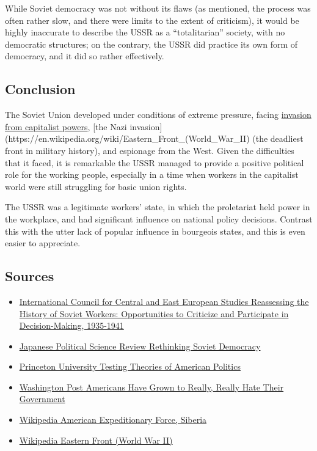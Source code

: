 While Soviet democracy was not without its flaws (as mentioned, the
process was often rather slow, and there were limits to the extent of
criticism), it would be highly inaccurate to describe the USSR as a
``totalitarian'' society, with no democratic structures; on the
contrary, the USSR did practice its own form of democracy, and it did so
rather effectively.

\subsection*{Conclusion}

The Soviet Union developed under conditions of extreme pressure, facing
\href{https://en.wikipedia.org/wiki/American_Expeditionary_Force,_Siberia}{invasion
from capitalist powers}, {[}the Nazi
invasion{]}(https://en.wikipedia.org/wiki/Eastern\_Front\_(World\_War\_II)
(the deadliest front in military history), and espionage from the West.
Given the difficulties that it faced, it is remarkable the USSR managed
to provide a positive political role for the working people, especially
in a time when workers in the capitalist world were still struggling for
basic union rights.

The USSR was a legitimate workers' state, in which the proletariat held
power in the workplace, and had significant influence on national policy
decisions. Contrast this with the utter lack of popular influence in
bourgeois states, and this is even easier to appreciate.

\subsection*{Sources}

\begin{itemize}
\tightlist
\item
  \href{https://www.docdroid.net/t9gG4jQ/thurston-robert-reassessing-the-history-of-soviet-workers-opportunities-to-criticize-and-participate-in-decision-making.pdf}{International
  Council for Central and East European Studies \textbar{} Reassessing
  the History of Soviet Workers: Opportunities to Criticize and
  Participate in Decision-Making, 1935-1941}
\item
  \href{http://jpsa-web.org/eibun_zassi/data/pdf/JPSA_Kawamoto_final_July_9_2014.pdf}{Japanese
  Political Science Review \textbar{} Rethinking Soviet Democracy}
\item
  \href{https://scholar.princeton.edu/sites/default/files/mgilens/files/gilens_and_page_2014_-testing_theories_of_american_politics.doc.pdf}{Princeton
  University \textbar{} Testing Theories of American Politics}
\item
  \href{https://www.washingtonpost.com/news/rampage/wp/2015/09/23/americans-have-grown-to-really-really-hate-their-government/}{Washington
  Post \textbar{} Americans Have Grown to Really, Really Hate Their
  Government}
\item
  \href{https://en.wikipedia.org/wiki/American_Expeditionary_Force,_Siberia}{Wikipedia
  \textbar{} American Expeditionary Force, Siberia}
\item
  \href{https://en.wikipedia.org/wiki/Eastern_Front_(World_War_II)}{Wikipedia
  \textbar{} Eastern Front (World War II)}
\end{itemize}
